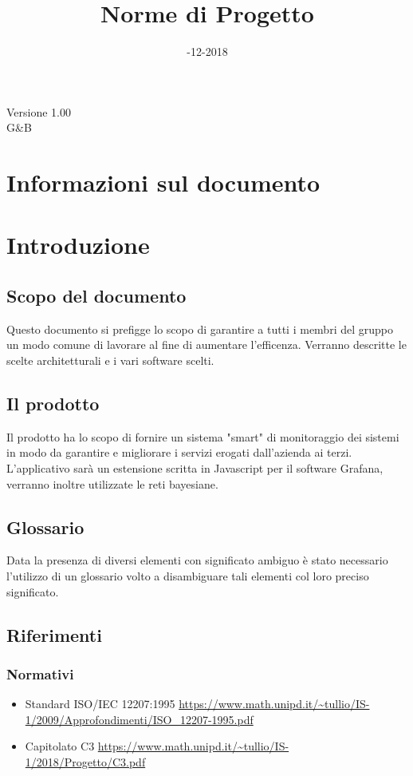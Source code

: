 \documentclass{article}
\title{\myfont Norme di Progetto}
\date{\myfont 04-12-2018}
\begin{document}
  \maketitle
  \begin{center}
  \huge Versione 1.00 
  \\G\&B
  \end{center}
  \newpage
  \tableofcontents
  \newpage

\section*{Informazioni sul documento}


\section{Introduzione}
    \subsection{Scopo del documento}
    Questo documento si prefigge lo scopo di garantire a tutti i membri del gruppo un modo comune di lavorare al fine di aumentare l'efficenza\pedice. Verranno descritte le scelte architetturali e i vari software scelti.
    \subsection{Il prodotto}
    Il prodotto ha lo scopo di fornire un sistema "smart" di monitoraggio dei sistemi in modo da garantire e migliorare i servizi erogati dall'azienda ai terzi. L'applicativo sarà un estensione scritta in Javascript per il software Grafana, verranno inoltre utilizzate le reti bayesiane.
    \subsection{Glossario}
    Data la presenza di diversi elementi con significato ambiguo è stato necessario l'utilizzo di un glossario volto a disambiguare tali elementi col loro preciso significato.
    \subsection{Riferimenti}
    \subsubsection{Normativi}
    \begin{itemize}
        \item Standard ISO/IEC 12207:1995 \newline \url{https://www.math.unipd.it/~tullio/IS-1/2009/Approfondimenti/ISO_12207-1995.pdf}
        \item Capitolato C3 \newline \url{https://www.math.unipd.it/~tullio/IS-1/2018/Progetto/C3.pdf}
    \end{itemize}
\end{document}
